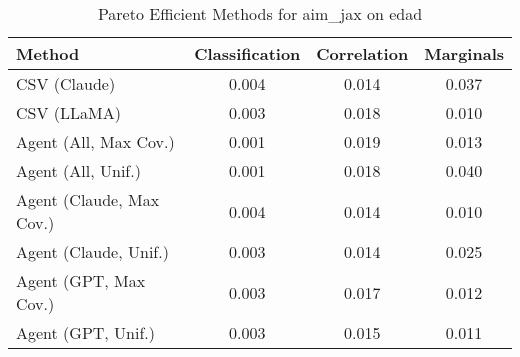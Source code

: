 \begin{table}[t!]
    \centering
    \caption{Pareto Efficient Methods for aim_jax on edad}
    \label{tab:pareto_efficient_methods_aim_jax_edad}
    \begin{tabular}{lccc}
    \toprule
    Method & Classification & Correlation & Marginals \\
    \midrule
    CSV (Claude) & 0.004 & \cellcolor{gold!30}0.014 & 0.037 \\
    CSV (LLaMA) & 0.003 & 0.018 & \cellcolor{gold!30}0.010 \\
    Agent (All, Max Cov.) & \cellcolor{silver!30}0.001 & 0.019 & 0.013 \\
    Agent (All, Unif.) & \cellcolor{gold!30}0.001 & 0.018 & 0.040 \\
    Agent (Claude, Max Cov.) & 0.004 & \cellcolor{silver!30}0.014 & \cellcolor{silver!30}0.010 \\
    Agent (Claude, Unif.) & 0.003 & \cellcolor{bronze!30}0.014 & 0.025 \\
    Agent (GPT, Max Cov.) & \cellcolor{bronze!30}0.003 & 0.017 & 0.012 \\
    Agent (GPT, Unif.) & 0.003 & 0.015 & \cellcolor{bronze!30}0.011 \\
    \bottomrule
    \end{tabular}
\end{table}